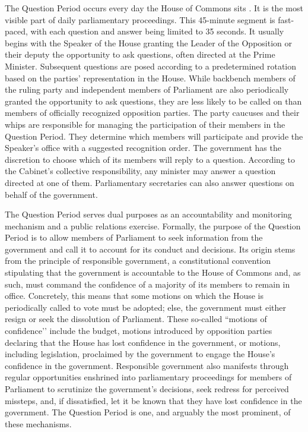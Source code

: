 {{The Question Period occurs every day the House of Commons sits \citep[chap.~11]{HOC_PNP}. It is the most visible part of daily parliamentary proceedings. This 45-minute segment is fast-paced, with each question and answer being limited to 35 seconds. It usually begins with the Speaker of the House granting the Leader of the Opposition or their deputy the opportunity to ask questions, often directed at the Prime Minister. Subsequent questions are posed according to a predetermined rotation based on the parties’ representation in the House. While backbench members of the ruling party and independent members of Parliament are also periodically granted the opportunity to ask questions, they are less likely to be called on than members of officially recognized opposition parties. The party caucuses and their whips are responsible for managing the participation of their members in the Question Period. They determine which members will participate and provide the Speaker’s office with a suggested recognition order. The government has the discretion to choose which of its members will reply to a question. According to the Cabinet’s collective responsibility, any minister may answer a question directed at one of them. Parliamentary secretaries can also answer questions on behalf of the government.

The Question Period serves dual purposes as an accountability and monitoring mechanism and a public relations exercise. Formally, the purpose of the Question Period is to allow members of Parliament to seek information from the government and call it to account for its conduct and decisions. Its origin stems from the principle of responsible government, a constitutional convention stipulating that the government is accountable to the House of Commons and, as such, must command the confidence of a majority of its members to remain in office. Concretely, this means that some motions on which the House is periodically called to vote must be adopted; else, the government must either resign or seek the dissolution of Parliament. These so-called ``motions of confidence’’ include the budget, motions introduced by opposition parties declaring that the House has lost confidence in the government, or motions, including legislation, proclaimed by the government to engage the House’s confidence in the government. Responsible government also manifests through regular opportunities enshrined into parliamentary proceedings for members of Parliament to scrutinize the government's decisions, seek redress for perceived missteps, and, if dissatisfied, let it be known that they have lost confidence in the government. The Question Period is one, and arguably the most prominent, of these mechanisms.

}}
